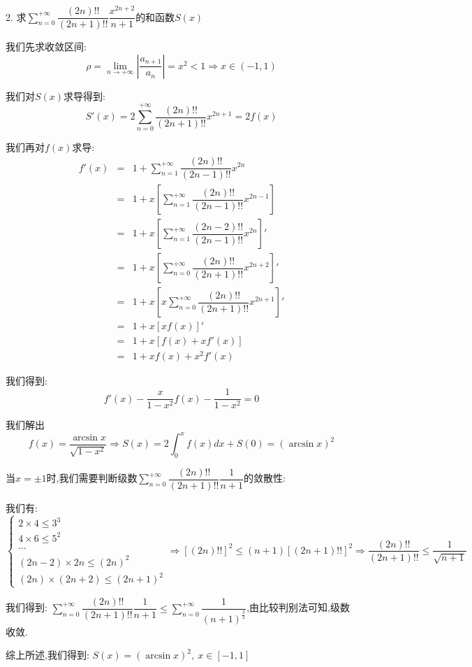 2. 求$\sum\limits_{n=0}^{+\infty}\dfrac{(2n)!!}{(2n+1)!!}\dfrac{x^{2n+2}}{n+1}$的和函数$S(x)$
\begin{solution}
	
	我们先求收敛区间: 
	$$\rho=\lim\limits_{n\rightarrow +\infty}|\dfrac{a_{n+1}}{a_{n}}|=x^2<1\Rightarrow x\in(-1,1)$$
	
	我们对$S(x)$求导得到: 
	$$S'(x)=2\sum\limits_{n=0}^{+\infty}\dfrac{(2n)!!}{(2n+1)!!}x^{2n+1}=2f(x)$$
	
	我们再对$f(x)$求导: 
	\begin{eqnarray*}
		f'(x)&=&1+\sum\limits_{n=1}^{+\infty}\dfrac{(2n)!!}{(2n-1)!!}x^{2n}\\
		&=&1+x[\sum\limits_{n=1}^{+\infty}\dfrac{(2n)!!}{(2n-1)!!}x^{2n-1}]\\
		&=&1+x[\sum\limits_{n=1}^{+\infty}\dfrac{(2n-2)!!}{(2n-1)!!}x^{2n}]'\\
		&=&1+x[\sum\limits_{n=0}^{+\infty}\dfrac{(2n)!!}{(2n+1)!!}x^{2n+2}]'\\
		&=&1+x[x\sum\limits_{n=0}^{+\infty}\dfrac{(2n)!!}{(2n+1)!!}x^{2n+1}]'\\
		&=&1+x[xf(x)]'\\
		&=&1+x[f(x)+xf'(x)]\\
		&=&1+xf(x)+x^2f'(x)
	\end{eqnarray*}

	我们得到: $$f'(x)-\dfrac{x}{1-x^2}f(x)-\dfrac{1}{1-x^2}=0$$
	
	我们解出$$f(x)=\dfrac{\arcsin x}{\sqrt{1-x^2}}\Rightarrow S(x)=2\int_{0} ^{x}f(x)dx+S(0)=(\arcsin x)^2$$
	
	当$x=\pm 1$时,我们需要判断级数$\sum\limits_{n=0}^{+\infty}\dfrac{(2n)!!}{(2n+1)!!}\dfrac{1}{n+1}$的敛散性: 
	
	我们有: $$\left\lbrace
	\begin{array}{l}
		2\times 4\leq 3^3\\
		4\times 6\leq 5^2\\
		\cdots\\
		(2n-2)\times 2n\leq (2n)^2\\
		(2n)\times(2n+2)\leq (2n+1)^2
	\end{array}
	\right. \Rightarrow [(2n)!!]^2\leq (n+1)[(2n+1)!!]^2\Rightarrow \dfrac{(2n)!!}{(2n+1)!!}\leq \dfrac{1}{\sqrt{n+1}}$$
	
	我们得到: $\sum\limits_{n=0}^{+\infty}\dfrac{(2n)!!}{(2n+1)!!}\dfrac{1}{n+1}\leq \sum\limits_{n=0}^{+\infty}\dfrac{1}{(n+1)^{\frac{3}{2}}}$,由比较判别法可知,级数收敛.
	
	综上所述,我们得到: $S(x)=(\arcsin x)^2,\ x\in[-1,1]$
\end{solution}

